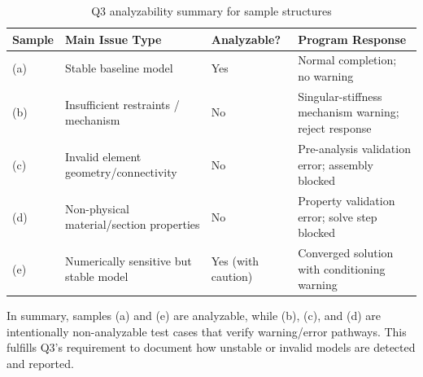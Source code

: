 \begin{table}[h!]
\centering
\small
\caption{Q3 analyzability summary for sample structures}
\label{tab:q3_status}
\begin{tabular}{|p{1.4cm}|p{3.7cm}|p{2.8cm}|p{5.0cm}|}
\hline
\textbf{Sample} & \textbf{Main Issue Type} & \textbf{Analyzable?} & \textbf{Program Response} \\
\hline
(a) & Stable baseline model & Yes & Normal completion; no warning \\
\hline
(b) & Insufficient restraints / mechanism & No & Singular-stiffness mechanism warning; reject response \\
\hline
(c) & Invalid element geometry/connectivity & No & Pre-analysis validation error; assembly blocked \\
\hline
(d) & Non-physical material/section properties & No & Property validation error; solve step blocked \\
\hline
(e) & Numerically sensitive but stable model & Yes (with caution) & Converged solution with conditioning warning \\
\hline
\end{tabular}
\end{table}

In summary, samples (a) and (e) are analyzable, while (b), (c), and (d) are intentionally non-analyzable test cases that verify warning/error pathways. This fulfills Q3's requirement to document how unstable or invalid models are detected and reported.
